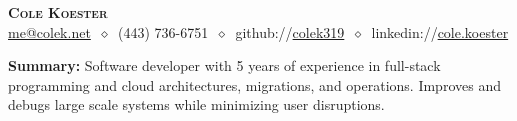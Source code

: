 \documentclass[letterpaper,11pt]{article}
\begin{document}
\begin{center}
  \textbf{\LARGE\scshape Cole Koester} \\
  \vspace{1pt}\small
  \href{mailto:}{me@colek.net}
  $\ \diamond\ $
  (443) 736-6751
  $\ \diamond\ $
  github://\href{https://github.com/}{colek319}
  $\ \diamond\ $
  linkedin://\href{https://www.linkedin.com/}{cole.koester}
\end{center}

\noindent\begin{minipage}{\textwidth}
\footnotesize
\textbf{Summary:} Software developer with 5 years of experience in full-stack programming and cloud architectures, migrations, and operations. Improves and debugs large scale systems while minimizing user disruptions.
\end{minipage}
\end{document}
